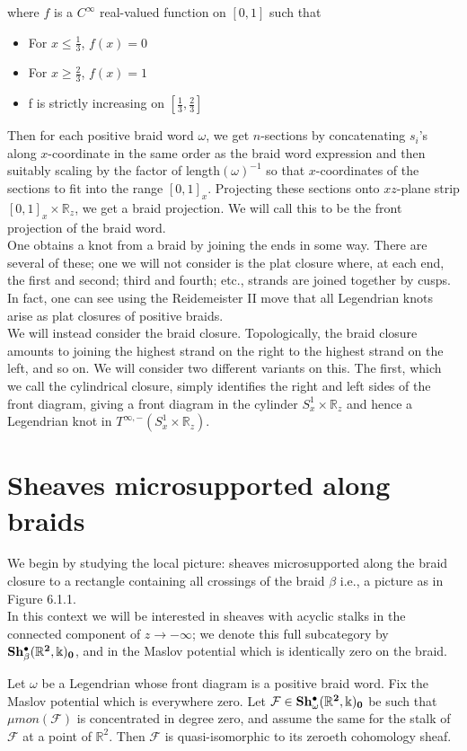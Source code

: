 where $f$ is a $C^\infty$ real-valued function on $[0,1]$ such that
\begin{itemize}
	\item For $x\leq \frac{1}{3}$, $f(x) = 0$ 
	\item For $x\geq \frac{2}{3}$, $f(x) = 1$
	\item f is strictly increasing on $[\frac{1}{3}, \frac{2}{3}]$ 
\end{itemize}
Then for each positive braid word $\omega$, we get $n$-sections by concatenating $s_i$'s along $x$-coordinate in the same order as the braid word expression and then suitably scaling by the factor of length$(\omega)^{-1}$ so that $x$-coordinates of the sections to fit into the range $[0,1]_x$. Projecting these sections onto $xz$-plane strip $[0,1]_x\times \mathbb{R}_z$, we get a braid projection. We will call this to be the front projection of the braid word.
\\
One obtains a knot from a braid by joining the ends in some way. There are several of these; one we will not consider is the plat closure where, at each end, the first and second; third and fourth; etc., strands are joined together by cusps. In fact, one can see using the Reidemeister \RN{2} move that all Legendrian knots arise as plat closures of positive braids.\\
We will instead consider the braid closure. Topologically, the braid closure amounts to joining the highest strand on the right to the highest strand on the left, and so on. We will consider two different variants on this. The first, which we call the cylindrical closure, simply identifies the right and left sides of the front diagram, giving a front diagram in the cylinder $S_x^1\times \mathbb{R}_z$ and hence a Legendrian knot in $T^{\infty,-}(S_x^1\times\mathbb{R}_z)$.\\
\bigskip

\section{Sheaves microsupported along braids}
We begin by studying the local picture: sheaves microsupported along the braid closure to a rectangle containing all crossings of the braid $\beta$ i.e., a picture as in Figure 6.1.1.\\
In this context we will be interested in sheaves with acyclic stalks in the connected component of $z\rightarrow -\infty$; we denote this full subcategory by $\bf{Sh^{\bullet}_{\beta}}(\mathbb{R}^2,\Bbbk)_0$, and in the Maslov potential which is identically zero on the braid.
\begin{proposition}
Let $\omega$ be a Legendrian whose front diagram is a positive braid word. Fix the Maslov potential which is everywhere zero. Let $\mathcal{F}\in \bf{Sh^{\bullet}_{\omega}}(\mathbb{R}^2,\Bbbk)_0$ be such that $\mu mon(\mathcal{F})$ is concentrated in degree zero, and assume the same for the stalk of $\mathcal{F}$ at a point of $\mathbb{R}^2$. Then $\mathcal{F}$ is quasi-isomorphic to its zeroeth cohomology sheaf.
\end{proposition}

